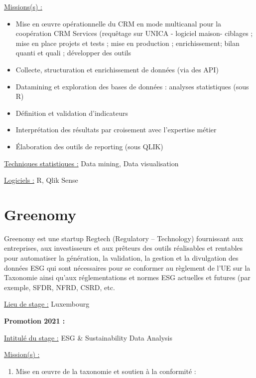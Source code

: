 \documentclass[
  letterpaper,
  DIV=11,
  numbers=noendperiod]{scrreprt}
\providecommand{\tightlist}{%
  \setlength{\itemsep}{0pt}\setlength{\parskip}{0pt}}\usepackage{longtable,booktabs,array}
\begin{document}
\uline{Missions(s) :}

\begin{itemize}
\item
  Mise en œuvre opérationnelle du CRM en mode multicanal pour la
  coopération CRM Services (requêtage sur UNICA - logiciel maison-
  ciblages ; mise en place projets et tests ; mise en production ;
  enrichissement; bilan quanti et quali ; développer des outils
\item
  Collecte, structuration et enrichissement de données (via des API)
\item
  Datamining et exploration des bases de données : analyses statistiques
  (sous R)
\item
  Définition et validation d'indicateurs
\item
  Interprétation des résultats par croisement avec l'expertise métier
\item
  Élaboration des outils de reporting (sous QLIK)
\end{itemize}

\uline{Techniques statistiques :} Data mining, Data visualisation

\uline{Logiciels :} R, Qlik Sense

\hypertarget{greenomy}{%
\section{\texorpdfstring{\textbf{Greenomy}}{Greenomy}}\label{greenomy}}

Greenomy est une startup Regtech (Regulatory -- Technology) fournissant
aux entreprises, aux investisseurs et aux prêteurs des outils
réalisables et rentables pour automatiser la génération, la validation,
la gestion et la divulgation des données ESG qui sont nécessaires pour
se conformer au règlement de l'UE sur la Taxonomie ainsi qu'aux
réglementations et normes ESG actuelles et futures (par exemple, SFDR,
NFRD, CSRD, etc.

\uline{Lieu de stage :} Luxembourg

\textbf{Promotion 2021 :}

\uline{Intitulé du stage :} ESG \& Sustainability Data Analysis

\uline{Mission(s) :}

\begin{enumerate}
\def\labelenumi{\arabic{enumi}.}
\tightlist
\item
  Mise en œuvre de la taxonomie et soutien à la conformité :
\end{enumerate}
\end{document}
